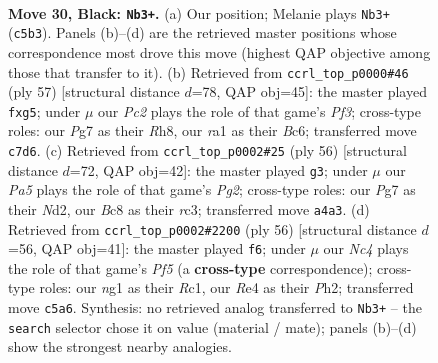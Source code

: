 \documentclass[11pt]{article}
\begin{document}
\clearpage

\begin{figure}[p]\centering
\begin{subfigure}{0.46\textwidth}\centering
\resizebox{\linewidth}{!}{%
\newchessgame
\chessboard[
  setfen={1rb3k1/p1p2pp1/3P3p/2n4P/p3r1n1/2P5/3K2R1/R1B2BN1 b - - 1 30},
  showmover=false,
  pgfstyle=straightmove, color=movearrow, markmove={c5-b3}
]}
\caption{}
\end{subfigure}\hfill
\begin{subfigure}{0.46\textwidth}\centering
\resizebox{\linewidth}{!}{%
\newchessgame
\chessboard[
  setfen={r6r/ppp1k3/2bnpp2/6P1/3P1B2/8/PP2B2P/2R1KR2 b - - 0 29},
  showmover=false,
  pgfstyle=straightmove, color=movearrow, markmove={f6-g5}
]}
\caption{}
\end{subfigure}
\\[4pt]
\begin{subfigure}{0.46\textwidth}\centering
\resizebox{\linewidth}{!}{%
\newchessgame
\chessboard[
  setfen={4k2r/b2b4/B2p4/4ppP1/P3P2B/2r1nP2/R2N2P1/1R5K w - - 1 29},
  showmover=false,
  pgfstyle=straightmove, color=movearrow, markmove={g2-g3}
]}
\caption{}
\end{subfigure}\hfill
\begin{subfigure}{0.46\textwidth}\centering
\resizebox{\linewidth}{!}{%
\newchessgame
\chessboard[
  setfen={r3k1r1/4bp1p/n3P3/1p3P2/b2B4/4N3/3P2PP/R1R3K1 w q - 1 29},
  showmover=false,
  pgfstyle=straightmove, color=movearrow, markmove={f5-f6}
]}
\caption{}
\end{subfigure}
\caption{\textbf{Move 30, Black: \texttt{Nb3+}.} (a) Our position; Melanie plays \texttt{Nb3+} (\texttt{c5b3}). Panels (b)--(d) are the retrieved master positions whose correspondence most drove this move (highest QAP objective among those that transfer to it). (b) Retrieved from \texttt{ccrl\_top\_p0000\#46} (ply 57) [structural distance $d$=78, QAP obj=45]: the master played \texttt{fxg5}; under $\mu$ our \emph{Pc2} plays the role of that game's \emph{Pf3}; cross-type roles: our \emph{P}g7 as their \emph{R}h8, our \emph{r}a1 as their \emph{B}c6; transferred move \texttt{c7d6}. (c) Retrieved from \texttt{ccrl\_top\_p0002\#25} (ply 56) [structural distance $d$=72, QAP obj=42]: the master played \texttt{g3}; under $\mu$ our \emph{Pa5} plays the role of that game's \emph{Pg2}; cross-type roles: our \emph{P}g7 as their \emph{N}d2, our \emph{B}c8 as their \emph{r}c3; transferred move \texttt{a4a3}. (d) Retrieved from \texttt{ccrl\_top\_p0002\#2200} (ply 56) [structural distance $d$=56, QAP obj=41]: the master played \texttt{f6}; under $\mu$ our \emph{Nc4} plays the role of that game's \emph{Pf5} (a \textbf{cross-type} correspondence); cross-type roles: our \emph{n}g1 as their \emph{R}c1, our \emph{R}e4 as their \emph{P}h2; transferred move \texttt{c5a6}. Synthesis: no retrieved analog transferred to \texttt{Nb3+} -- the \texttt{search} selector chose it on value (material / mate); panels (b)--(d) show the strongest nearby analogies.}
\label{fig:thought-m59}
\end{figure}
\end{document}
